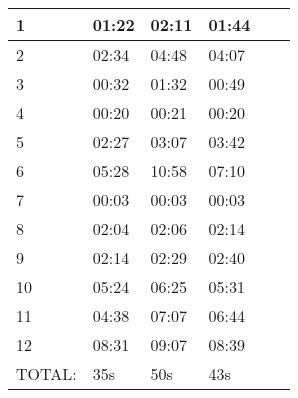 \documentclass{l4proj}
\begin{document}
\begin{appendices}
\begin{tabular}{  | l | l | l | l | l | l | }
\hline
  1 & 01:22 & 02:11 & 01:44 \\
\hline
  2 & 02:34 & 04:48 & 04:07 \\
\hline  
  3 & 00:32 & 01:32 & 00:49 \\
\hline  
  4 & 00:20 & 00:21 & 00:20 \\
\hline  
  5 & 02:27 & 03:07 & 03:42 \\
\hline  
  6 & 05:28 & 10:58 & 07:10 \\
\hline
  7 & 00:03 & 00:03 & 00:03 \\
\hline
  8 & 02:04 & 02:06 & 02:14 \\
\hline
  9 & 02:14 & 02:29 & 02:40 \\
\hline
  10 & 05:24 & 06:25 & 05:31 \\
\hline
  11 & 04:38 & 07:07 & 06:44 \\
\hline
  12 & 08:31 & 09:07 & 08:39 \\
\hline
  TOTAL: & 35s & 50s & 43s\\
\hline
\end{tabular}

\end{appendices}
\end{document}
